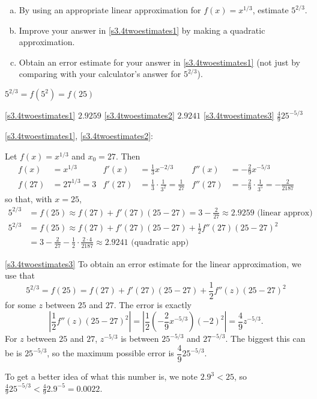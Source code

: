 \begin{question}[1997H]
\begin{enumerate}[(a)]
\item\label{s3.4twoestimates1} By using an appropriate linear approximation for
$f(x)=x^{1/3}$, estimate $5^{2/3}$.
\item\label{s3.4twoestimates2} Improve your answer in \eqref{s3.4twoestimates1} by making a quadratic approximation.
\item\label{s3.4twoestimates3} Obtain an error estimate for your answer in \eqref{s3.4twoestimates1} (not just
by comparing with your calculator's answer for $5^{2/3}$).
\end{enumerate}
\end{question}
\begin{hint}
$5^{2/3}=f(5^2)=f(25)$
\end{hint}
\begin{answer}
\eqref{s3.4twoestimates1} $2.9259$ \qquad
\eqref{s3.4twoestimates2} $2.9241$ \qquad
\eqref{s3.4twoestimates3} $\frac{4}{9}25^{-5/3}$
\end{answer}
\begin{solution}
\eqref{s3.4twoestimates1}, \eqref{s3.4twoestimates2}:

Let $f(x)=x^{1/3}$ and $x_0=27$. Then
\begin{align*}
f(x)&=x^{1/3} &
f'(x)&=\frac{1}{3}x^{-2/3} & f''(x)&=-\frac{2}{9}x^{-5/3} \\
f(27)&=27^{1/3}=3 &
f'(27)&=\frac{1}{3}\cdot\frac{1}{3^2}=\frac{1}{27} & f''(27)&=-\frac{2}{9}\cdot\frac{1}{3^5}=-\frac{2}{2187}
\end{align*}
so that, with $x=25$,
\begin{align*}
5^{2/3}&=f(25) \approx f(27)+f'(27)(25-27) =3-\frac{2}{27}
\approx 2.9259 \mbox{ (linear approx)}\\
5^{2/3}&=f(25)\approx f(27)+f'(27)(25-27)+\frac{1}{2} f''(27)(25-27)^2\\
&=3-\frac{2}{27}-\frac{1}{2}\cdot\frac{2\cdot 4}{2187}
 \approx 2.9241 \mbox{ (quadratic app)}
 \end{align*}

\eqref{s3.4twoestimates3}
To obtain an error estimate for the linear approximation, we use that
$$
5^{2/3}=f(25)= f(27)+f'(27)(25-27)+\frac{1}{2} f''(z)(25-27)^2
$$
for some $z$ between $25$ and $27$. The error is exactly
\[\left|\frac{1}{2} f''(z)(25-27)^2\right|
=\left|\frac{1}{2} \left(-\frac{2}{9}x^{-5/3}\right)(-2)^2\right|
=\frac{4}{9}z^{-5/3}.\] For $z$ between $25$ and $27$, $z^{-5/3}$
is between $25^{-5/3}$ and $27^{-5/3}$. The biggest this can be is
$25^{-5/3}$, so the maximum possible error
is {$\dfrac{4}{9}25^{-5/3}$}.

 To get a better idea of what this number is, we note
 $2.9^3<25$,  so
$\frac{4}{9}25^{-5/3}<\frac{4}{9}2.9^{-5}=0.0022$.
\end{solution}


